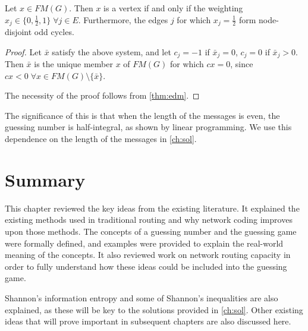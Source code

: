\newpage

\begin{theorem}
	Let $x \in FM(G)$. Then $x$ is a vertex if and only if the weighting $x_j \in \{ 0, \frac{1}{2}, 1 \} \; \forall j \in E$. Furthermore, the edges $j$ for which $x_j = \frac{1}{2}$ form node-disjoint odd cycles.
	\label{thm:pul}
\end{theorem}
\begin{proof}
Let $\bar{x}$ satisfy the above system, and let $c_j = -1$ if $\bar{x}_j = 0$, $c_j = 0$ if $\bar{x}_j > 0$. Then $\bar{x}$ is the unique member $x$ of $FM(G)$ for which $cx = 0$, since $cx < 0 \; \forall x \in FM(G) \setminus \{ \bar{x} \}$.

The necessity of the proof follows from \autoref{thm:edm}.
\end{proof}

The significance of this is that when the length of the messages is even, the guessing number is half-integral, as shown by linear programming. We use this dependence on the length of the messages in \autoref{ch:sol}.

\section{Summary}

This chapter reviewed the key ideas from the existing literature. It explained the existing methods used in traditional routing and why network coding improves upon those methods. The concepts of a guessing number and the guessing game were formally defined, and examples were provided to explain the real-world meaning of the concepts. It also reviewed work on network routing capacity in order to fully understand how these ideas could be included into the guessing game.

Shannon's information entropy and some of Shannon's inequalities are also explained, as these will be key to the solutions provided in \autoref{ch:sol}. Other existing ideas that will prove important in subsequent chapters are also discussed here.